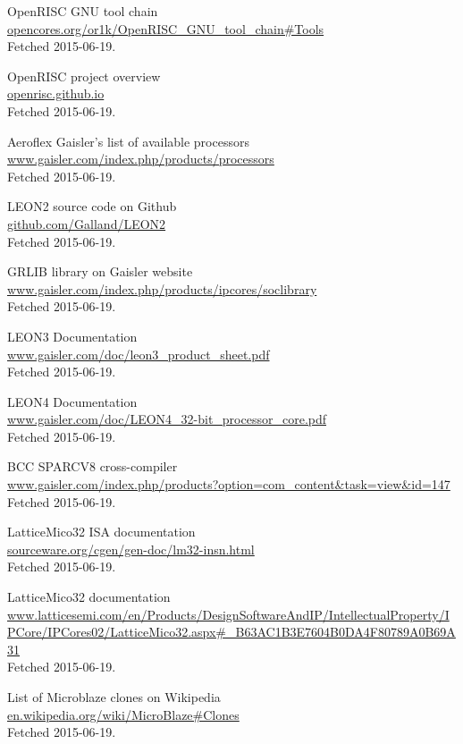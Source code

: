 \documentclass[11pt,a4paper,twoside,openany]{report}
\begin{document}
\begin{thebibliography}{99}
	OpenRISC GNU tool chain\\
	\url{opencores.org/or1k/OpenRISC_GNU_tool_chain#Tools}\\
	Fetched 2015-06-19.

	OpenRISC project overview\\
	\url{openrisc.github.io}\\
	Fetched 2015-06-19.

	Aeroflex Gaisler's list of available processors\\
	\url{www.gaisler.com/index.php/products/processors}\\
	Fetched 2015-06-19.

	LEON2 source code on Github\\
	\url{github.com/Galland/LEON2}\\
	Fetched 2015-06-19.

	GRLIB library on Gaisler website\\
	\url{www.gaisler.com/index.php/products/ipcores/soclibrary}\\
	Fetched 2015-06-19.

	LEON3 Documentation\\
	\url{www.gaisler.com/doc/leon3_product_sheet.pdf}\\
	Fetched 2015-06-19.

	LEON4 Documentation\\
	\url{www.gaisler.com/doc/LEON4_32-bit_processor_core.pdf}\\
	Fetched 2015-06-19.

	BCC SPARCV8 cross-compiler\\
	\url{www.gaisler.com/index.php/products?option=com_content&task=view&id=147}\\
	Fetched 2015-06-19.

	LatticeMico32 ISA documentation\\
	\url{sourceware.org/cgen/gen-doc/lm32-insn.html}\\
	Fetched 2015-06-19.

	LatticeMico32 documentation\\
	\url{www.latticesemi.com/en/Products/DesignSoftwareAndIP/IntellectualProperty/IPCore/IPCores02/LatticeMico32.aspx#_B63AC1B3E7604B0DA4F80789A0B69A31}\\
	Fetched 2015-06-19.

	List of Microblaze clones on Wikipedia\\
	\url{en.wikipedia.org/wiki/MicroBlaze#Clones}\\
	Fetched 2015-06-19.


\end{thebibliography}
\end{document}
